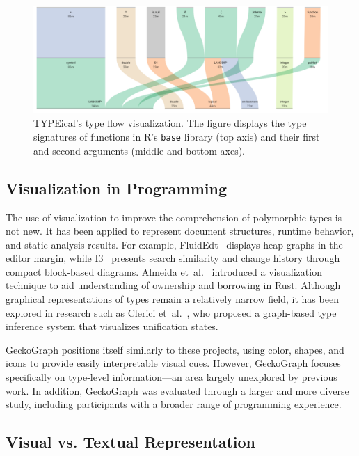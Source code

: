 \documentclass[preprint,12pt]{elsarticle}
\begin{document}
\begin{figure}
  \includegraphics[width=\linewidth]{figures/Typical.png}
  \caption{
        \label{fig:typical}
        TYPEical’s type flow visualization. 
        The figure displays the type signatures of functions in R’s \texttt{base} library (top axis) and their first and second arguments (middle and bottom axes).
  }
\end{figure}

\subsection{Visualization in Programming}
\label{sec:viz-programming}

The use of visualization to improve the comprehension of polymorphic types is not new. 
It has been applied to represent document structures, runtime behavior, and static analysis results. 
For example, FluidEdt~\cite{Ou2015-vr} displays heap graphs in the editor margin, while I3~\cite{Beck2015-my} presents search similarity and change history through compact block-based diagrams. 
Almeida et~al.~\cite{Almeida2022-bv} introduced a visualization technique to aid understanding of ownership and borrowing in Rust. 
Although graphical representations of types remain a relatively narrow field, it has been explored in research such as Clerici et~al.~\cite{Clerici2013-ru}, who proposed a graph-based type inference system that visualizes unification states.

GeckoGraph positions itself similarly to these projects, using color, shapes, and icons to provide easily interpretable visual cues. 
However, GeckoGraph focuses specifically on type-level information—an area largely unexplored by previous work. 
In addition, GeckoGraph was evaluated through a larger and more diverse study, including participants with a broader range of programming experience.

\subsection{Visual vs. Textual Representation}
\label{sec:visual-vs-textual}
\end{document}
